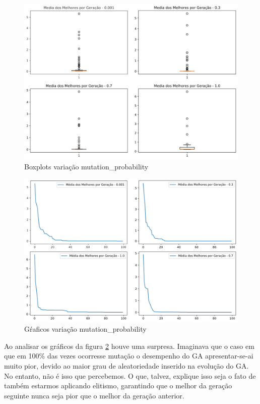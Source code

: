 \documentclass[12pt]{article}
\begin{document}
	\begin{figure}[H]
		\centering
		\includegraphics[width=0.9\linewidth]{Imagens/mutacao/boxplotMutacao}
		\caption{Boxplots variação mutation\_probability}
		\label{fig:boxplotmutacao}
	\end{figure}
	\begin{figure}[H]
		\centering
		\includegraphics[width=0.9\linewidth]{Imagens/mutacao/graficoMutacao}
		\caption{Gŕaficos variação mutation\_probability}
		\label{fig:graficomutacao}
	\end{figure}
	
	Ao analisar os gráficos da figura \ref{fig:graficomutacao} houve uma surpresa. Imaginava que o caso em que em 100\% das vezes ocorresse mutação o desempenho do GA apresentar-se-ai muito pior, devido ao maior grau de aleatoriedade inserido na evolução do GA. No entanto, não é isso que percebemos. O que, talvez, explique isso seja o fato de também estarmos aplicando elitismo, garantindo que o melhor da geração seguinte nunca seja pior que o melhor da geração anterior. 
	
\end{document}
